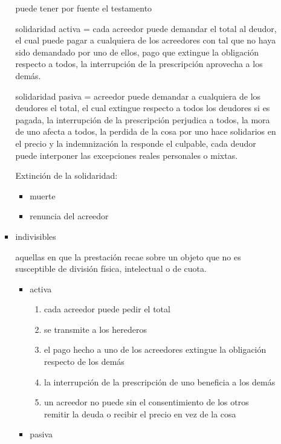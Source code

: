 \documentclass[]{article}
\providecommand{\tightlist}{%
  \setlength{\itemsep}{0pt}\setlength{\parskip}{0pt}}
\begin{document}
\begin{itemize}
\begin{itemize}
\begin{itemize}
      puede tener por fuente el testamento

      solidaridad activa = cada acreedor puede demandar el total al
      deudor, el cual puede pagar a cualquiera de los acreedores con tal
      que no haya sido demandado por uno de ellos, pago que extingue la
      obligación respecto a todos, la interrupción de la prescripción
      aprovecha a los demás.

      solidaridad pasiva = acreedor puede demandar a cualquiera de los
      deudores el total, el cual extingue respecto a todos los deudores
      si es pagada, la interrupción de la prescripción perjudica a
      todos, la mora de uno afecta a todos, la perdida de la cosa por
      uno hace solidarios en el precio y la indemnización la responde el
      culpable, cada deudor puede interponer las excepciones reales
      personales o mixtas.

      Extinción de la solidaridad:

      \begin{itemize}
      \tightlist
      \item
        muerte
      \item
        renuncia del acreedor
      \end{itemize}
    \item
      indivisibles

      aquellas en que la prestación recae sobre un objeto que no es
      susceptible de división física, intelectual o de cuota.

      \begin{itemize}
      \tightlist
      \item
        activa

        \begin{enumerate}
        \def\labelenumi{\arabic{enumi}.}
        \tightlist
        \item
          cada acreedor puede pedir el total
        \item
          se transmite a los herederos
        \item
          el pago hecho a uno de los acreedores extingue la obligación
          respecto de los demás
        \item
          la interrupción de la prescripción de uno beneficia a los
          demás
        \item
          un acreedor no puede sin el consentimiento de los otros
          remitir la deuda o recibir el precio en vez de la cosa
        \end{enumerate}
      \item
        pasiva


\end{itemize}
\end{itemize}
\end{itemize}
\end{itemize}
\end{document}
